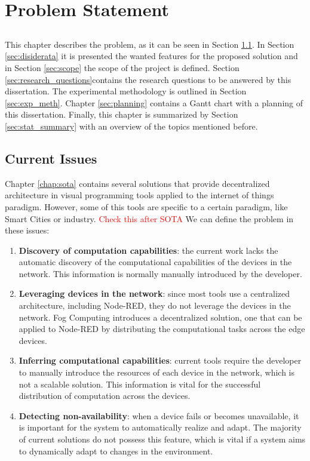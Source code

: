 \chapter{Problem Statement} \label{chap:problem_statement}

\section*{}

This chapter describes the problem, as it can be seen in Section \ref{sec:current_issues}. In Section \ref{sec:disiderata} it is presented the wanted features for the proposed solution and in Section \ref{sec:scope} the scope of the project is defined. Section \ref{sec:research_questions}contains the research questions to be answered by this dissertation. The experimental methodology is outlined in Section \ref{sec:exp_meth}. Chapter \ref{sec:planning} contains a Gantt chart with a planning of this dissertation. Finally, this chapter is summarized by Section \ref{sec:stat_summary} with an overview of the topics mentioned before.

\section{Current Issues}\label{sec:current_issues}

Chapter \ref{chap:sota} contains several solutions that provide decentralized architecture in visual programming tools applied to the internet of things paradigm. However, some of this tools are specific to a certain paradigm, like Smart Cities or industry. \textcolor{red}{Check this after SOTA}
We can define the problem in these issues:
\begin{enumerate}
    \item \textbf{Discovery of computation capabilities}: the current work lacks the automatic discovery of the computational capabilities of the devices in the network. This information is normally manually introduced by the developer.
    \item \textbf{Leveraging devices in the network}: since most tools use a centralized architecture, including Node-RED, they do not leverage the devices in the network. Fog Computing introduces a decentralized solution, one that can be applied to Node-RED by distributing the computational tasks across the edge devices.
    \item \textbf{Inferring computational capabilities}: current tools require the developer to manually introduce the resources of each device in the network, which is not a scalable solution. This information is vital for the successful distribution of computation across the devices.
    \item \textbf{Detecting non-availability}: when a device fails or becomes unavailable, it is important for the system to automatically realize and adapt. The majority of current solutions do not possess this feature, which is vital if a system aims to dynamically adapt to changes in the environment.
\end{enumerate}

